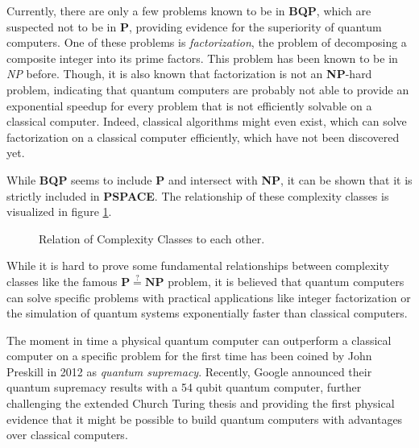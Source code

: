 Currently, there are only a few problems known to be in \textbf{BQP}, which are suspected not to be in \textbf{P}, providing evidence for the superiority of quantum computers. One
of these problems is \textit{factorization}, the problem of decomposing a
composite integer into its prime factors. This problem has been known to be in
\textit{NP} before. Though, it is also known that factorization is not an \textbf{NP}-hard problem, indicating that quantum computers are probably not able to provide
an exponential speedup for every problem that is not efficiently solvable on a
classical computer. Indeed, classical algorithms might even exist, which can
solve factorization on a classical computer efficiently, which have not been
discovered yet.

While \textbf{BQP} seems to include \textbf{P} and intersect with \textbf{NP}, it can be shown that it is strictly
included in \textbf{PSPACE}. The relationship of these complexity classes is visualized
in figure \ref{fig:complexityclasses}.

\begin{figure}[H]
  \centering
  \caption[Relation of Complexity Classes to each other]{Relation of Complexity Classes to each other.}
  \label{fig:complexityclasses}
\end{figure}

While it is hard to prove some fundamental relationships between complexity
classes like the famous $\mathbf{P} \stackrel{?}{=} \mathbf{NP}$ problem, it is believed that quantum computers
can solve specific problems with practical applications like integer factorization or the simulation of
quantum systems exponentially faster than classical computers.

The moment
in time a physical quantum computer can outperform a classical computer
on a specific problem for the first time has been coined by John Preskill in
2012 as \textit{quantum supremacy}. Recently, Google announced their quantum
supremacy results with a 54 qubit quantum computer, further challenging the
extended Church Turing thesis and providing the first physical evidence that it
might be possible to build quantum computers with advantages over classical
computers.